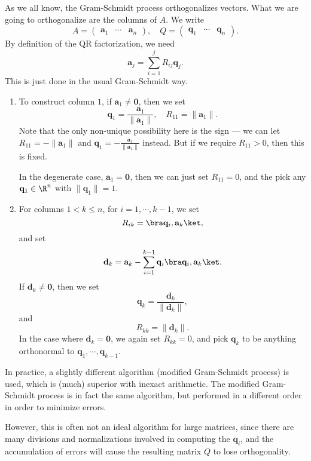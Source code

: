 \documentclass[a4paper]{article}
\begin{document}
As we all know, the Gram-Schmidt process orthogonalizes vectors. What we are going to orthogonalize are the columns of $A$. We write
\[
  A =
  \begin{pmatrix}
    \mathbf{a}_1 & \cdots & \mathbf{a}_n
  \end{pmatrix},\quad
  Q =
  \begin{pmatrix}
    \mathbf{q}_1 & \cdots & \mathbf{q}_n
  \end{pmatrix}.
\]
By definition of the QR factorization, we need
\[
  \mathbf{a}_j = \sum_{i = 1}^j R_{ij} \mathbf{q}_j.
\]
This is just done in the usual Gram-Schmidt way.
\begin{enumerate}
  \item To construct column $1$, if $\mathbf{a}_1 \not= \mathbf{0}$, then we set
    \[
      \mathbf{q}_1 = \frac{\mathbf{a}_1}{\|\mathbf{a}_1\|},\quad R_{11} = \|\mathbf{a}_1\|.
    \]
    Note that the only non-unique possibility here is the sign --- we can let $R_{11} = - \|\mathbf{a}_1\|$ and $\mathbf{q}_1 = -\frac{\mathbf{a}_1}{\|\mathbf{a}_1\|}$ instead. But if we require $R_{11} > 0$, then this is fixed.

    In the degenerate case, $\mathbf{a}_1 = \mathbf{0}$, then we can just set $R_{11} = 0$, and the pick any $\mathbf{q}_1 \in \R^n$ with $\|\mathbf{q}_1\| = 1$.
  \item For columns $1 < k \leq n$, for $i = 1, \cdots, k - 1$, we set
    \[
      R_{ik} = \bra \mathbf{q}_i, \mathbf{a}_k\ket,
    \]
    and set
    \[
      \mathbf{d}_k = \mathbf{a}_k - \sum_{i = 1}^{k - 1} \mathbf{q}_i \bra \mathbf{q}_i, \mathbf{a}_k\ket.
    \]
    If $\mathbf{d}_k \not= \mathbf{0}$, then we set
    \[
      \mathbf{q}_k = \frac{\mathbf{d}_k}{\|\mathbf{d}_k\|},
    \]
    and
    \[
      R_{kk} = \|\mathbf{d}_k\|.
    \]
    In the case where $\mathbf{d}_k = \mathbf{0}$, we again set $R_{kk} = 0$, and pick $\mathbf{q}_k$ to be anything orthonormal to $\mathbf{q}_1, \cdots, \mathbf{q}_{k - 1}$.
\end{enumerate}

In practice, a slightly different algorithm (modified Gram-Schmidt process) is used, which is (much) superior with inexact arithmetic. The modified Gram-Schmidt process is in fact the same algorithm, but performed in a different order in order to minimize errors.

However, this is often not an ideal algorithm for large matrices, since there are many divisions and normalizations involved in computing the $\mathbf{q}_i$, and the accumulation of errors will cause the resulting matrix $Q$ to lose orthogonality.
\end{document}
